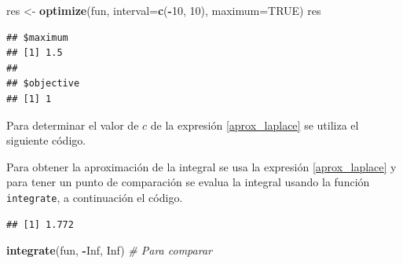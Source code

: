 \documentclass[10pt,]{krantz}
\makeatletter
\newenvironment{Shaded}{\begin{snugshade}}{\end{snugshade}}
\newcommand{\KeywordTok}[1]{\textcolor[rgb]{0.13,0.29,0.53}{\textbf{#1}}}
\newcommand{\DataTypeTok}[1]{\textcolor[rgb]{0.13,0.29,0.53}{#1}}
\newcommand{\DecValTok}[1]{\textcolor[rgb]{0.00,0.00,0.81}{#1}}
\newcommand{\StringTok}[1]{\textcolor[rgb]{0.31,0.60,0.02}{#1}}
\newcommand{\CommentTok}[1]{\textcolor[rgb]{0.56,0.35,0.01}{\textit{#1}}}
\newcommand{\OtherTok}[1]{\textcolor[rgb]{0.56,0.35,0.01}{#1}}
\newcommand{\OperatorTok}[1]{\textcolor[rgb]{0.81,0.36,0.00}{\textbf{#1}}}
\newcommand{\NormalTok}[1]{#1}
\newenvironment{kframe}{%
\medskip{}
\setlength{\fboxsep}{.8em}
 \def\at@end@of@kframe{}%
 \ifinner\ifhmode%
  \def\at@end@of@kframe{\end{minipage}}%
  \begin{minipage}{\columnwidth}%
 \fi\fi%
 \def\FrameCommand##1{\hskip\@totalleftmargin \hskip-\fboxsep
 \colorbox{shadecolor}{##1}\hskip-\fboxsep
     \hskip-\linewidth \hskip-\@totalleftmargin \hskip\columnwidth}%
 \MakeFramed {\advance\hsize-\width
   \@totalleftmargin\z@ \linewidth\hsize
   \@setminipage}}%
 {\par\unskip\endMakeFramed%
 \at@end@of@kframe}
\renewenvironment{Shaded}{\begin{kframe}}{\end{kframe}}
\makeatother
\begin{document}
\begin{Shaded}
\begin{Highlighting}[]
\NormalTok{res <-}\StringTok{ }\KeywordTok{optimize}\NormalTok{(fun, }\DataTypeTok{interval=}\KeywordTok{c}\NormalTok{(}\OperatorTok{-}\DecValTok{10}\NormalTok{, }\DecValTok{10}\NormalTok{), }\DataTypeTok{maximum=}\OtherTok{TRUE}\NormalTok{)}
\NormalTok{res}
\end{Highlighting}
\end{Shaded}

\begin{verbatim}
## $maximum
## [1] 1.5
## 
## $objective
## [1] 1
\end{verbatim}

Para determinar el valor de \(c\) de la expresión \ref{aprox_laplace} se
utiliza el siguiente código.

\begin{Shaded}
\end{Shaded}

Para obtener la aproximación de la integral se usa la expresión
\ref{aprox_laplace} y para tener un punto de comparación se evalua la
integral usando la función \texttt{integrate}, a continuación el código.

\begin{Shaded}
\end{Shaded}

\begin{verbatim}
## [1] 1.772
\end{verbatim}

\begin{Shaded}
\begin{Highlighting}[]
\KeywordTok{integrate}\NormalTok{(fun, }\OperatorTok{-}\OtherTok{Inf}\NormalTok{, }\OtherTok{Inf}\NormalTok{)  }\CommentTok{# Para comparar}
\end{Highlighting}
\end{Shaded}
\end{document}
